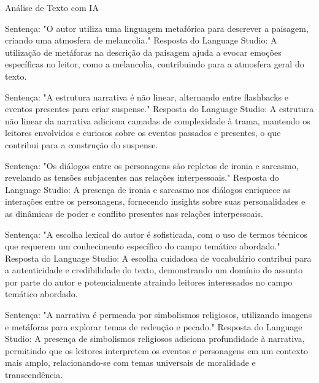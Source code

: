 Análise de Texto com IA

Sentença: "O autor utiliza uma linguagem metafórica para descrever a paisagem, criando uma atmosfera de melancolia."
Resposta do Language Studio: A utilização de metáforas na descrição da paisagem ajuda a evocar emoções específicas no leitor, como a melancolia, contribuindo para a atmosfera geral do texto.

Sentença: "A estrutura narrativa é não linear, alternando entre flashbacks e eventos presentes para criar suspense."
Resposta do Language Studio: A estrutura não linear da narrativa adiciona camadas de complexidade à trama, mantendo os leitores envolvidos e curiosos sobre os eventos passados e presentes, o que contribui para a construção do suspense.

Sentença: "Os diálogos entre os personagens são repletos de ironia e sarcasmo, revelando as tensões subjacentes nas relações interpessoais."
Resposta do Language Studio: A presença de ironia e sarcasmo nos diálogos enriquece as interações entre os personagens, fornecendo insights sobre suas personalidades e as dinâmicas de poder e conflito presentes nas relações interpessoais.

Sentença: "A escolha lexical do autor é sofisticada, com o uso de termos técnicos que requerem um conhecimento específico do campo temático abordado."
Resposta do Language Studio: A escolha cuidadosa de vocabulário contribui para a autenticidade e credibilidade do texto, demonstrando um domínio do assunto por parte do autor e potencialmente atraindo leitores interessados no campo temático abordado.

Sentença: "A narrativa é permeada por simbolismos religiosos, utilizando imagens e metáforas para explorar temas de redenção e pecado."
Resposta do Language Studio: A presença de simbolismos religiosos adiciona profundidade à narrativa, permitindo que os leitores interpretem os eventos e personagens em um contexto mais amplo, relacionando-se com temas universais de moralidade e transcendência.